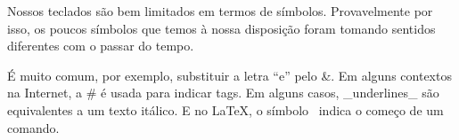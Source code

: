 \documentclass{article}
\begin{document}
Nossos teclados são bem limitados em termos de símbolos. Provavelmente por
isso, os poucos símbolos que temos à nossa disposição foram tomando sentidos
diferentes com o passar do tempo.

É muito comum, por exemplo, substituir a letra “e” pelo &. Em alguns contextos
na Internet, a # é usada para indicar tags. Em alguns casos, _underlines_ são
equivalentes a um texto itálico. E no \LaTeX, o símbolo \ indica o começo de um
comando.
\end{document}
